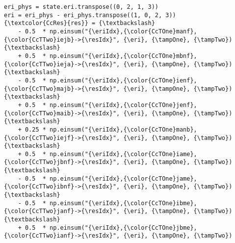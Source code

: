 %
%
%

\newcommand{\eri}{\textcolor{CcEri}{eri.block("oovv")}}
\newcommand{\eriIdx}{\textcolor{CcEri}{mnef}}
\newcommand{\tampOne}{\textcolor{CcTOne}{t2}}
\newcommand{\tampTwo}{\textcolor{CcTTwo}{t2}}
\newcommand{\resIdx}{\textcolor{CcRes}{iajb}}

\begin{BVerbatim}[commandchars=\\\{\},fontsize={\smaller}]
eri_phys = state.eri.transpose((0, 2, 1, 3))
eri = eri_phys - eri_phys.transpose((1, 0, 2, 3))
{\textcolor{CcRes}{res}} = {\textbackslash}
    - 0.5  * np.einsum("{\eriIdx},{\color{CcTOne}manf},{\color{CcTTwo}iejb}->{\resIdx}", {\eri}, {\tampOne}, {\tampTwo}) {\textbackslash}
    + 0.5  * np.einsum("{\eriIdx},{\color{CcTOne}mbnf},{\color{CcTTwo}ieja}->{\resIdx}", {\eri}, {\tampOne}, {\tampTwo}) {\textbackslash}
    - 0.5  * np.einsum("{\eriIdx},{\color{CcTOne}ienf},{\color{CcTTwo}majb}->{\resIdx}", {\eri}, {\tampOne}, {\tampTwo}) {\textbackslash}
    + 0.5  * np.einsum("{\eriIdx},{\color{CcTOne}jenf},{\color{CcTTwo}maib}->{\resIdx}", {\eri}, {\tampOne}, {\tampTwo}) {\textbackslash}
    + 0.25 * np.einsum("{\eriIdx},{\color{CcTOne}manb},{\color{CcTTwo}iejf}->{\resIdx}", {\eri}, {\tampOne}, {\tampTwo}) {\textbackslash}
    + 0.5  * np.einsum("{\eriIdx},{\color{CcTOne}iame},{\color{CcTTwo}jbnf}->{\resIdx}", {\eri}, {\tampOne}, {\tampTwo}) {\textbackslash}
    - 0.5  * np.einsum("{\eriIdx},{\color{CcTOne}jame},{\color{CcTTwo}ibnf}->{\resIdx}", {\eri}, {\tampOne}, {\tampTwo}) {\textbackslash}
    - 0.5  * np.einsum("{\eriIdx},{\color{CcTOne}ibme},{\color{CcTTwo}janf}->{\resIdx}", {\eri}, {\tampOne}, {\tampTwo}) {\textbackslash}
    + 0.5  * np.einsum("{\eriIdx},{\color{CcTOne}jbme},{\color{CcTTwo}ianf}->{\resIdx}", {\eri}, {\tampOne}, {\tampTwo})
\end{BVerbatim}
